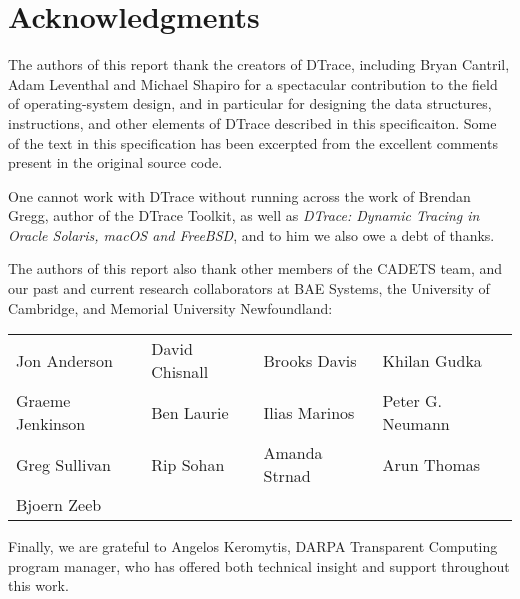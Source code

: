 \section*{Acknowledgments}
The authors of this report thank the creators of DTrace, including
Bryan Cantril, Adam Leventhal and Michael Shapiro for a spectacular
contribution to the field of operating-system design, and in
particular for designing the data structures, instructions, and other
elements of DTrace described in this specificaiton.  Some of the text
in this specification has been excerpted from the excellent comments
present in the original source code.

One cannot work with DTrace without running across the work of Brendan
Gregg, author of the DTrace Toolkit, as well as \emph{DTrace: Dynamic
  Tracing in Oracle Solaris, macOS and FreeBSD}, and to him we also
owe a debt of thanks.

The authors of this report also thank other members of the CADETS team, and
our past and current research collaborators at BAE Systems, the University of
Cambridge, and Memorial University Newfoundland:

%
%
\begin{tabular}{llll}
Jon Anderson & David Chisnall & Brooks Davis & Khilan Gudka \\
Graeme Jenkinson & Ben Laurie & Ilias Marinos & Peter G. Neumann \\
Greg Sullivan & Rip Sohan & Amanda Strnad & Arun Thomas \\
Bjoern Zeeb
\end{tabular}

\bigskip

%
%
%

\noindent
Finally, we are grateful to Angelos Keromytis, DARPA Transparent Computing
program manager, who has offered both technical insight and support throughout
this work.
